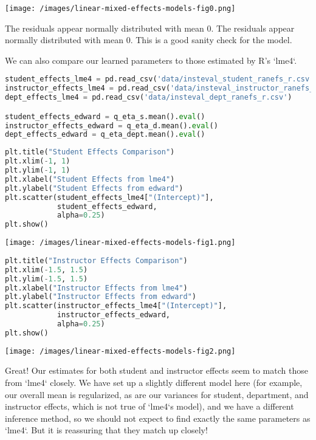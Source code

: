 \texttt{[image: /images/linear-mixed-effects-models-fig0.png]}

The residuals appear normally distributed with mean 0. The residuals
appear normally distributed with mean 0. This is a good
sanity check for the model.

We can also compare our learned parameters to those estimated by R's
`lme4`.

\begin{lstlisting}[language=Python]
student_effects_lme4 = pd.read_csv('data/insteval_student_ranefs_r.csv')
instructor_effects_lme4 = pd.read_csv('data/insteval_instructor_ranefs_r.csv')
dept_effects_lme4 = pd.read_csv('data/insteval_dept_ranefs_r.csv')

student_effects_edward = q_eta_s.mean().eval()
instructor_effects_edward = q_eta_d.mean().eval()
dept_effects_edward = q_eta_dept.mean().eval()
\end{lstlisting}

\begin{lstlisting}[language=Python]
plt.title("Student Effects Comparison")
plt.xlim(-1, 1)
plt.ylim(-1, 1)
plt.xlabel("Student Effects from lme4")
plt.ylabel("Student Effects from edward")
plt.scatter(student_effects_lme4["(Intercept)"],
            student_effects_edward,
            alpha=0.25)
plt.show()
\end{lstlisting}

\texttt{[image: /images/linear-mixed-effects-models-fig1.png]}

\begin{lstlisting}[language=Python]
plt.title("Instructor Effects Comparison")
plt.xlim(-1.5, 1.5)
plt.ylim(-1.5, 1.5)
plt.xlabel("Instructor Effects from lme4")
plt.ylabel("Instructor Effects from edward")
plt.scatter(instructor_effects_lme4["(Intercept)"],
            instructor_effects_edward,
            alpha=0.25)
plt.show()
\end{lstlisting}

\texttt{[image: /images/linear-mixed-effects-models-fig2.png]}

Great!  Our estimates for both student and instructor effects seem to
match those from `lme4` closely.  We have set up a slightly different
model here (for example, our overall mean is regularized, as are our
variances for student, department, and instructor effects, which is not
true of `lme4`s model), and we have a different inference method, so we
should not expect to find exactly the same parameters as `lme4`.  But
it is reassuring that they match up closely!

